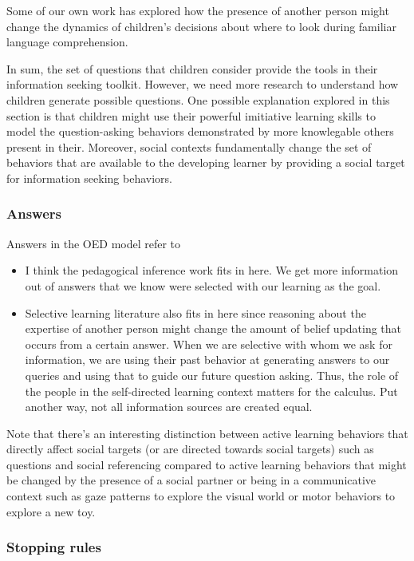 \documentclass[english,man]{apa6}
\theoremstyle{definition}
\theoremstyle{definition}
\theoremstyle{definition}
\theoremstyle{remark}
\begin{document}
Some of our own work has explored how the presence of another person
might change the dynamics of children's decisions about where to look
during familiar language comprehension.

In sum, the set of questions that children consider provide the tools in
their information seeking toolkit. However, we need more research to
understand how children generate possible questions. One possible
explanation explored in this section is that children might use their
powerful imitiative learning skills to model the question-asking
behaviors demonstrated by more knowlegable others present in their.
Moreover, social contexts fundamentally change the set of behaviors that
are available to the developing learner by providing a social target for
information seeking behaviors.

\subsubsection{Answers}\label{answers}

Answers in the OED model refer to

\begin{itemize}
\item
  I think the pedagogical inference work fits in here. We get more
  information out of answers that we know were selected with our
  learning as the goal.
\item
  Selective learning literature also fits in here since reasoning about
  the expertise of another person might change the amount of belief
  updating that occurs from a certain answer. When we are selective with
  whom we ask for information, we are using their past behavior at
  generating answers to our queries and using that to guide our future
  question asking. Thus, the role of the people in the self-directed
  learning context matters for the calculus. Put another way, not all
  information sources are created equal.
\end{itemize}

Note that there's an interesting distinction between active learning
behaviors that directly affect social targets (or are directed towards
social targets) such as questions and social referencing compared to
active learning behaviors that might be changed by the presence of a
social partner or being in a communicative context such as gaze patterns
to explore the visual world or motor behaviors to explore a new toy.

\subsubsection{Stopping rules}\label{stopping-rules}
\end{document}
